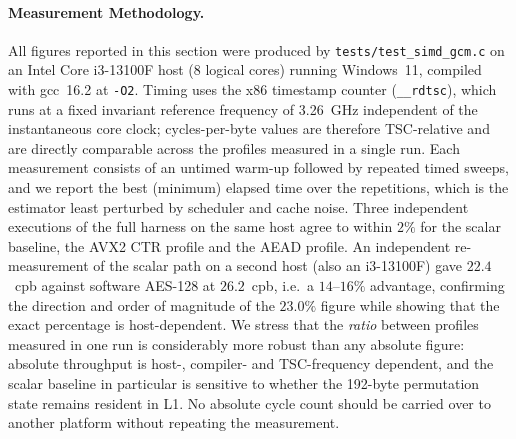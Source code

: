 \documentclass[10pt,twocolumn]{article}
\begin{document}
\paragraph{Measurement Methodology.}
All figures reported in this section were produced by \texttt{tests/test\_simd\_gcm.c} on an Intel Core i3-13100F host (8 logical cores) running Windows~11, compiled with gcc~16.2 at \texttt{-O2}. Timing uses the x86 timestamp counter (\texttt{\_\_rdtsc}), which runs at a fixed invariant reference frequency of 3.26~GHz independent of the instantaneous core clock; cycles-per-byte values are therefore TSC-relative and are directly comparable across the profiles measured in a single run. Each measurement consists of an untimed warm-up followed by repeated timed sweeps, and we report the best (minimum) elapsed time over the repetitions, which is the estimator least perturbed by scheduler and cache noise. Three independent executions of the full harness on the same host agree to within $2\%$ for the scalar baseline, the AVX2 CTR profile and the AEAD profile. An independent re-measurement of the scalar path on a second host (also an i3-13100F) gave $22.4$~cpb against software AES-128 at $26.2$~cpb, i.e.\ a $14$--$16\%$ advantage, confirming the direction and order of magnitude of the $23.0\%$ figure while showing that the exact percentage is host-dependent. We stress that the \emph{ratio} between profiles measured in one run is considerably more robust than any absolute figure: absolute throughput is host-, compiler- and TSC-frequency dependent, and the scalar baseline in particular is sensitive to whether the 192-byte permutation state remains resident in L1. No absolute cycle count should be carried over to another platform without repeating the measurement.

\begin{table}[htbp]
\caption{Benchmark evaluation of Tesseract-128 execution profiles and Tesseract-GCM on a 5~MB payload (50 iterations, non-AES-NI software baseline on Intel Core x86-64).}
\label{tab:simd_gcm_benchmark}
\centering
\small
{}
\end{table}
\end{document}
